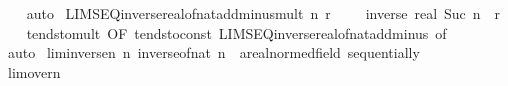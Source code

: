\begin{isabellebody}
\ \ \isamarkupfalse%
\ auto%
\endisatagproof
{\isafoldproof}%
%
\isadelimproof
\isanewline
%
\endisadelimproof
\isanewline
{}\isamarkupfalse%
\ LIMSEQ{\isacharunderscore}{\kern0pt}inverse{\isacharunderscore}{\kern0pt}real{\isacharunderscore}{\kern0pt}of{\isacharunderscore}{\kern0pt}nat{\isacharunderscore}{\kern0pt}add{\isacharunderscore}{\kern0pt}minus{\isacharunderscore}{\kern0pt}mult{\isacharcolon}{\kern0pt}\ {\isachardoublequoteopen}{\isacharparenleft}{\kern0pt}{\isasymlambda}n{\isachardot}{\kern0pt}\ r\ {\isacharasterisk}{\kern0pt}\ {\isacharparenleft}{\kern0pt}{}\ {\isacharplus}{\kern0pt}\ {\isacharminus}{\kern0pt}\ inverse\ {\isacharparenleft}{\kern0pt}real\ {\isacharparenleft}{\kern0pt}Suc\ n{\isacharparenright}{\kern0pt}{\isacharparenright}{\kern0pt}{\isacharparenright}{\kern0pt}{\isacharparenright}{\kern0pt}\ {\isasymlonglonglongrightarrow}\ r{\isachardoublequoteclose}\isanewline
%
\isadelimproof
\ \ %
\endisadelimproof
%
\isatagproof
{}\isamarkupfalse%
\ tendsto{\isacharunderscore}{\kern0pt}mult\ {\isacharbrackleft}{\kern0pt}OF\ tendsto{\isacharunderscore}{\kern0pt}const\ LIMSEQ{\isacharunderscore}{\kern0pt}inverse{\isacharunderscore}{\kern0pt}real{\isacharunderscore}{\kern0pt}of{\isacharunderscore}{\kern0pt}nat{\isacharunderscore}{\kern0pt}add{\isacharunderscore}{\kern0pt}minus\ {\isacharbrackleft}{\kern0pt}of\ {}{\isacharbrackright}{\kern0pt}{\isacharbrackright}{\kern0pt}\isanewline
\ \ \isamarkupfalse%
\ auto%
\endisatagproof
{\isafoldproof}%
%
\isadelimproof
\isanewline
%
\endisadelimproof
\isanewline
{}\isamarkupfalse%
\ lim{\isacharunderscore}{\kern0pt}inverse{\isacharunderscore}{\kern0pt}n{\isacharcolon}{\kern0pt}\ {\isachardoublequoteopen}{\isacharparenleft}{\kern0pt}{\isacharparenleft}{\kern0pt}{\isasymlambda}n{\isachardot}{\kern0pt}\ inverse{\isacharparenleft}{\kern0pt}of{\isacharunderscore}{\kern0pt}nat\ n{\isacharparenright}{\kern0pt}{\isacharparenright}{\kern0pt}\ {\isasymlonglongrightarrow}\ {\isacharparenleft}{\kern0pt}{}{\isacharcolon}{\kern0pt}{\isacharcolon}{\kern0pt}{\isacharprime}{\kern0pt}a{\isacharcolon}{\kern0pt}{\isacharcolon}{\kern0pt}real{\isacharunderscore}{\kern0pt}normed{\isacharunderscore}{\kern0pt}field{\isacharparenright}{\kern0pt}{\isacharparenright}{\kern0pt}\ sequentially{\isachardoublequoteclose}\isanewline
%
\isadelimproof
\ \ %
\endisadelimproof
%
\isatagproof
{}\isamarkupfalse%
\ lim{\isacharunderscore}{\kern0pt}{}{\isacharunderscore}{\kern0pt}over{\isacharunderscore}{\kern0pt}n\ \isamarkupfalse%

\end{isabellebody}
